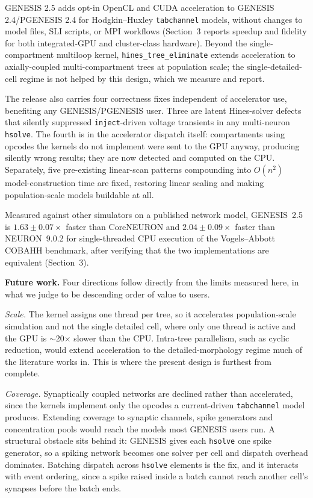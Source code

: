 \documentclass[preprint,12pt, a4paper]{elsarticle}
\newcommand{\hte}{\texttt{hines\_\allowbreak tree\_\allowbreak eliminate}}
\begin{document}
\begin{enumerate}
GENESIS 2.5 adds opt-in OpenCL and CUDA acceleration to GENESIS 2.4/PGENESIS 2.4 for Hodgkin--Huxley \texttt{tabchannel} models, without changes to model files, SLI scripts, or MPI workflows (Section~3 reports speedup and fidelity for both integrated-GPU and cluster-class hardware). Beyond the single-compartment multiloop kernel, \hte{} extends acceleration to axially-coupled multi-compartment trees at population scale; the single-detailed-cell regime is not helped by this design, which we measure and report.

The release also carries four correctness fixes independent of accelerator use, benefiting any GENESIS/PGENESIS user. Three are latent Hines-solver defects that silently suppressed \texttt{inject}-driven voltage transients in any multi-neuron \texttt{hsolve}. The fourth is in the accelerator dispatch itself: compartments using opcodes the kernels do not implement were sent to the GPU anyway, producing silently wrong results; they are now detected and computed on the CPU. Separately, five pre-existing linear-scan patterns compounding into $O(n^2)$ model-construction time are fixed, restoring linear scaling and making population-scale models buildable at all.

Measured against other simulators on a published network model, GENESIS~2.5 is $1.63\pm0.07\times$ faster than CoreNEURON and $2.04\pm0.09\times$ faster than NEURON~9.0.2 for single-threaded CPU execution of the Vogels--Abbott COBAHH benchmark, after verifying that the two implementations are equivalent (Section~3).

\textbf{Future work.} Four directions follow directly from the limits measured here, in what we judge to be descending order of value to users.

\emph{Scale.} The kernel assigns one thread per tree, so it accelerates population-scale simulation and not the single detailed cell, where only one thread is active and the GPU is $\sim$20$\times$ slower than the CPU. Intra-tree parallelism, such as cyclic reduction, would extend acceleration to the detailed-morphology regime much of the literature works in. This is where the present design is furthest from complete.

\emph{Coverage.} Synaptically coupled networks are declined rather than accelerated, since the kernels implement only the opcodes a current-driven \texttt{tabchannel} model produces. Extending coverage to synaptic channels, spike generators and concentration pools would reach the models most GENESIS users run. A structural obstacle sits behind it: GENESIS gives each \texttt{hsolve} one spike generator, so a spiking network becomes one solver per cell and dispatch overhead dominates. Batching dispatch across \texttt{hsolve} elements is the fix, and it interacts with event ordering, since a spike raised inside a batch cannot reach another cell's synapses before the batch ends.


\end{enumerate}
\end{document}

